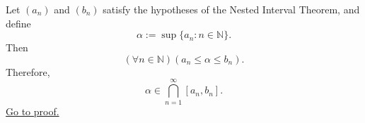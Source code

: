 \begin{corollary}
\label{cor:nested-interval-intersection-contains-endpoint-supremum}
Let $(a_n)$ and $(b_n)$ satisfy the hypotheses of the Nested Interval Theorem,
and define
\[
  \alpha:=\sup\{a_n:n\in\mathbb{N}\}.
\]
Then
\[
  (\forall n\in\mathbb{N})(a_n\leq\alpha\leq b_n).
\]
Therefore,
\[
  \alpha\in \bigcap_{n=1}^{\infty}[a_n,b_n].
\]
\hyperref[prf:nested-interval-intersection-contains-endpoint-supremum]{Go to proof.}
\end{corollary}